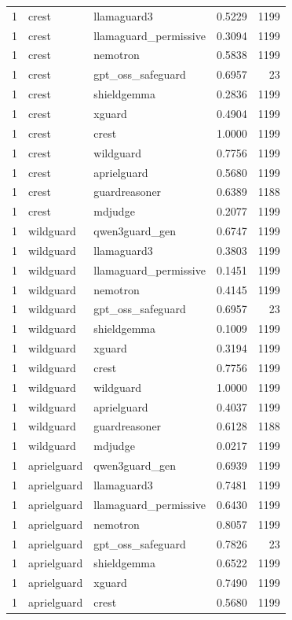 \begin{tabular}{rllrr}
1 & crest & llamaguard3 & 0.5229 & 1199 \\
1 & crest & llamaguard\_permissive & 0.3094 & 1199 \\
1 & crest & nemotron & 0.5838 & 1199 \\
1 & crest & gpt\_oss\_safeguard & 0.6957 & 23 \\
1 & crest & shieldgemma & 0.2836 & 1199 \\
1 & crest & xguard & 0.4904 & 1199 \\
1 & crest & crest & 1.0000 & 1199 \\
1 & crest & wildguard & 0.7756 & 1199 \\
1 & crest & aprielguard & 0.5680 & 1199 \\
1 & crest & guardreasoner & 0.6389 & 1188 \\
1 & crest & mdjudge & 0.2077 & 1199 \\
1 & wildguard & qwen3guard\_gen & 0.6747 & 1199 \\
1 & wildguard & llamaguard3 & 0.3803 & 1199 \\
1 & wildguard & llamaguard\_permissive & 0.1451 & 1199 \\
1 & wildguard & nemotron & 0.4145 & 1199 \\
1 & wildguard & gpt\_oss\_safeguard & 0.6957 & 23 \\
1 & wildguard & shieldgemma & 0.1009 & 1199 \\
1 & wildguard & xguard & 0.3194 & 1199 \\
1 & wildguard & crest & 0.7756 & 1199 \\
1 & wildguard & wildguard & 1.0000 & 1199 \\
1 & wildguard & aprielguard & 0.4037 & 1199 \\
1 & wildguard & guardreasoner & 0.6128 & 1188 \\
1 & wildguard & mdjudge & 0.0217 & 1199 \\
1 & aprielguard & qwen3guard\_gen & 0.6939 & 1199 \\
1 & aprielguard & llamaguard3 & 0.7481 & 1199 \\
1 & aprielguard & llamaguard\_permissive & 0.6430 & 1199 \\
1 & aprielguard & nemotron & 0.8057 & 1199 \\
1 & aprielguard & gpt\_oss\_safeguard & 0.7826 & 23 \\
1 & aprielguard & shieldgemma & 0.6522 & 1199 \\
1 & aprielguard & xguard & 0.7490 & 1199 \\
1 & aprielguard & crest & 0.5680 & 1199 \\

\end{tabular}
